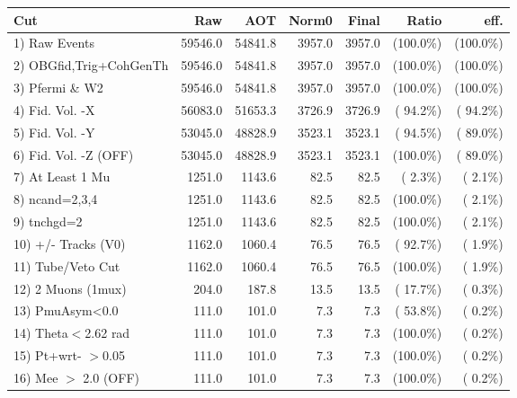  \begin{table}[h!]\centering
 \begin{tabular}{||l||r|r|r|r|r|r||}
 \hline
 \hline
 Cut & Raw & AOT & Norm0 & Final & Ratio & eff.       \\
 \hline
  1) Raw Events           &      59546.0 &      54841.8 &       3957.0 &       3957.0 & (100.0\%) & (100.0\%) \\
  2) OBGfid,Trig+CohGenTh &      59546.0 &      54841.8 &       3957.0 &       3957.0 & (100.0\%) & (100.0\%) \\
  3) Pfermi \& W2         &      59546.0 &      54841.8 &       3957.0 &       3957.0 & (100.0\%) & (100.0\%) \\
  4) Fid. Vol. -X         &      56083.0 &      51653.3 &       3726.9 &       3726.9 & ( 94.2\%) & ( 94.2\%) \\
  5) Fid. Vol. -Y         &      53045.0 &      48828.9 &       3523.1 &       3523.1 & ( 94.5\%) & ( 89.0\%) \\
  6) Fid. Vol. -Z (OFF)   &      53045.0 &      48828.9 &       3523.1 &       3523.1 & (100.0\%) & ( 89.0\%) \\
  7) At Least 1 Mu        &       1251.0 &       1143.6 &         82.5 &         82.5 & (  2.3\%) & (  2.1\%) \\
  8) ncand=2,3,4          &       1251.0 &       1143.6 &         82.5 &         82.5 & (100.0\%) & (  2.1\%) \\
  9) tnchgd=2             &       1251.0 &       1143.6 &         82.5 &         82.5 & (100.0\%) & (  2.1\%) \\
 10) +/- Tracks (V0)      &       1162.0 &       1060.4 &         76.5 &         76.5 & ( 92.7\%) & (  1.9\%) \\
 11) Tube/Veto Cut        &       1162.0 &       1060.4 &         76.5 &         76.5 & (100.0\%) & (  1.9\%) \\
 12) 2 Muons (1mux)       &        204.0 &        187.8 &         13.5 &         13.5 & ( 17.7\%) & (  0.3\%) \\
 13) PmuAsym<0.0          &        111.0 &        101.0 &          7.3 &          7.3 & ( 53.8\%) & (  0.2\%) \\
 14) Theta$<$2.62 rad     &        111.0 &        101.0 &          7.3 &          7.3 & (100.0\%) & (  0.2\%) \\
 15) Pt+wrt- $>$0.05      &        111.0 &        101.0 &          7.3 &          7.3 & (100.0\%) & (  0.2\%) \\
 16) Mee $>$ 2.0  (OFF)   &        111.0 &        101.0 &          7.3 &          7.3 & (100.0\%) & (  0.2\%) \\

\end{tabular}
\end{table}
